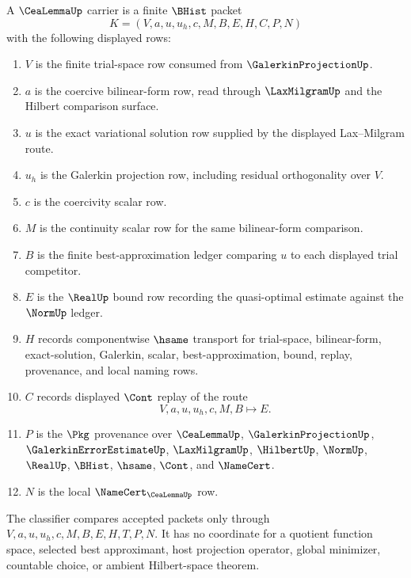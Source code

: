 \begin{definition}
\label{def:cea-lemma-carrier}
A $\CeaLemmaUp$ carrier is a finite $\BHist$ packet
$$
K=(V,a,u,u_h,c,M,B,E,H,C,P,N)
$$
with the following displayed rows:
\begin{enumerate}
\item $V$ is the finite trial-space row consumed from $\GalerkinProjectionUp$.
\item $a$ is the coercive bilinear-form row, read through $\LaxMilgramUp$ and the Hilbert comparison surface.
\item $u$ is the exact variational solution row supplied by the displayed Lax--Milgram route.
\item $u_h$ is the Galerkin projection row, including residual orthogonality over $V$.
\item $c$ is the coercivity scalar row.
\item $M$ is the continuity scalar row for the same bilinear-form comparison.
\item $B$ is the finite best-approximation ledger comparing $u$ to each displayed trial competitor.
\item $E$ is the $\RealUp$ bound row recording the quasi-optimal estimate against the $\NormUp$ ledger.
\item $H$ records componentwise $\hsame$ transport for trial-space, bilinear-form, exact-solution, Galerkin, scalar, best-approximation, bound, replay, provenance, and local naming rows.
\item $C$ records displayed $\Cont$ replay of the route
$$
V,a,u,u_h,c,M,B \longmapsto E .
$$
\item $P$ is the $\Pkg$ provenance over $\CeaLemmaUp$, $\GalerkinProjectionUp$, $\GalerkinErrorEstimateUp$, $\LaxMilgramUp$, $\HilbertUp$, $\NormUp$, $\RealUp$, $\BHist$, $\hsame$, $\Cont$, and $\NameCert$.
\item $N$ is the local $\NameCert_{\CeaLemmaUp}$ row.
\end{enumerate}
The classifier compares accepted packets only through $V,a,u,u_h,c,M,B,E,H,T,P,N$. It has no coordinate for a quotient function space, selected best approximant, host projection operator, global minimizer, countable choice, or ambient Hilbert-space theorem.
\end{definition}

